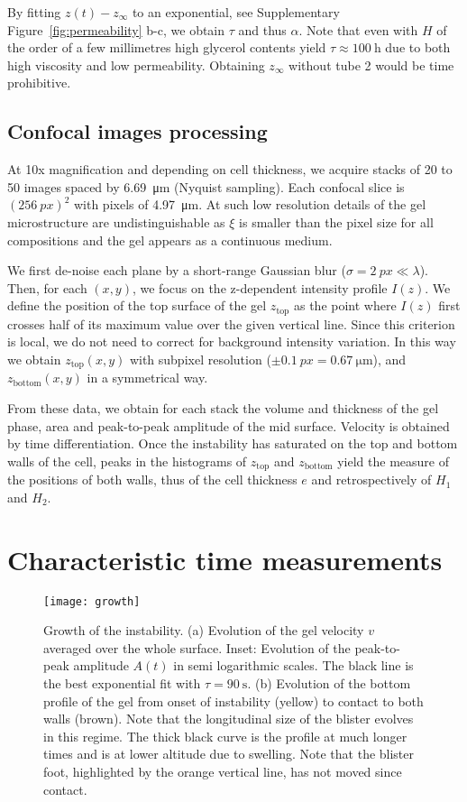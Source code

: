 \documentclass[twocolumn,superscriptaddress,showpacs,preprintnumbers,
amsmath,amssymb,prl]{revtex4-1}
\begin{document}
By fitting $z(t)-z_\infty$ to an exponential, see Supplementary Figure~\ref{fig:permeability} b-c, we obtain $\tau$ and thus $\alpha$. Note that even with $H$ of the order of a few millimetres high glycerol contents yield $\tau\approx \SI{100}{\hour}$ due to both high viscosity and low permeability. Obtaining $z_\infty$ without tube 2 would be time prohibitive.



\subsection*{Confocal images processing}

At 10x magnification and depending on cell thickness, we acquire stacks of 20 to 50 images spaced by \SI{6.69}{\micro\metre} (Nyquist sampling). Each confocal slice is $(\SI{256}{px})^2$ with pixels of \SI{4.97}{\micro\metre}. At such low resolution details of the gel microstructure are undistinguishable as $\xi$ is smaller than the pixel size for all compositions and the gel appears as a continuous medium.

We first de-noise each plane by a short-range Gaussian blur ($\sigma=\SI{2}{px}\ll\lambda$). Then, for each $(x,y)$, we focus on the z-dependent intensity profile $I(z)$. We define the position of the top surface of the gel $z_\text{top}$ as the point where $I(z)$ first crosses half of its maximum value over the given vertical line. Since this criterion is local, we do not need to correct for background intensity variation. In this way we obtain $z_\text{top}(x,y)$ with subpixel resolution ($\pm\SI{0.1}{px}=\SI{0.67}{\micro\metre}$), and $z_\text{bottom}(x,y)$ in a symmetrical way.

From these data, we obtain for each stack the volume and thickness of the gel phase, area and peak-to-peak amplitude of the mid surface. Velocity is obtained by time differentiation. Once the instability has saturated on the top and bottom walls of the cell, peaks in the histograms of $z_\text{top}$ and $z_\text{bottom}$ yield the measure of the positions of both walls, thus of the cell thickness $e$ and retrospectively of $H_1$ and $H_2$.

\section*{Characteristic time measurements}
\begin{figure}
	\texttt{[image: growth]}
	\caption{Growth of the instability. (a) Evolution of the gel velocity $v$ averaged over the whole surface. Inset: Evolution of the peak-to-peak amplitude $A(t)$ in semi logarithmic scales. The black line is the best exponential fit with $\tau=\SI{90}{\second}$. (b) Evolution of the bottom profile of the gel from onset of instability (yellow) to contact to both walls (brown). Note that the longitudinal size of the blister evolves in this regime. The thick black curve is the profile at much longer times and is at lower altitude due to swelling. Note that the blister foot, highlighted by the orange vertical line, has not moved since contact.}
	\label{fig:growth}
\end{figure}
\end{document}
